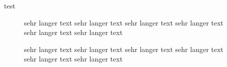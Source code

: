 \documentclass[12pt]{article}
\begin{document}
test
\begin{figure}
	\caption{sehr langer text sehr langer text sehr langer text sehr langer text sehr langer text sehr langer text}
\end{figure}
\captionsetup{labelsep=test}
\begin{figure}
	\caption{sehr langer text sehr langer text sehr langer text sehr langer text sehr langer text sehr langer text}
\end{figure}
\end{document}

